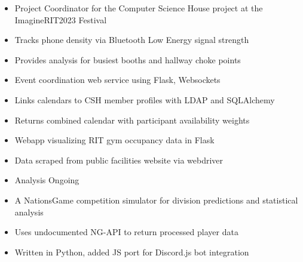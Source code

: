 \documentclass[10pt,a4paper,ragged2e,withhyper]{altacv}
\begin{document}
\begin{paracol}{2}


\begin{itemize}
    \item Project Coordinator for the Computer Science House project at the ImagineRIT2023 Festival
    \item Tracks phone density via Bluetooth Low Energy signal strength
    \item Provides analysis for busiest booths and hallway choke points
\end{itemize}\par


\divider

\begin{itemize}
    \item Event coordination web service using Flask, Websockets
    \item Links calendars to CSH member profiles with LDAP and SQLAlchemy
    \item Returns combined calendar with participant availability weights
\end{itemize}

\divider

\begin{itemize}
    \item Webapp visualizing RIT gym occupancy data in Flask
    \item Data scraped from public facilities website via webdriver
    \item Analysis Ongoing
\end{itemize}

\divider


\begin{itemize}
    \item A NationsGame competition simulator for division predictions and statistical analysis
    \item Uses undocumented NG-API to return processed player data
    \item Written in Python, added JS port for Discord.js bot integration
\end{itemize}\par


\end{paracol}
\end{document}
